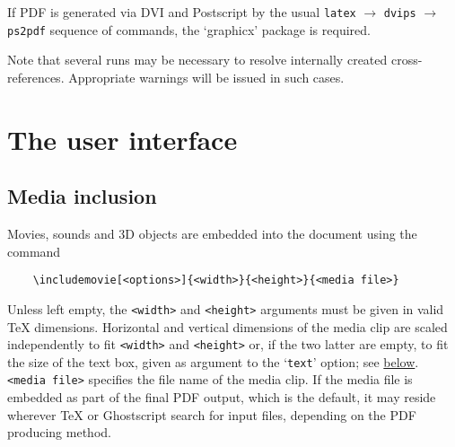 \documentclass[a4paper]{article}
\begin{document}
If PDF is generated via DVI and Postscript by the usual \verb+latex+ $\rightarrow$ \verb+dvips+ $\rightarrow$ \verb+ps2pdf+ sequence of commands, the `graphicx' package is required.

Note that several runs may be necessary to resolve internally created cross-references. Appropriate warnings will be issued in such cases.

\section{The user interface}
\subsection{Media inclusion}\label{usrif}
Movies, sounds and 3D objects are embedded into the document using the command
\begin{verbatim}
    \includemovie[<options>]{<width>}{<height>}{<media file>}
\end{verbatim}
Unless left empty, the \verb+<width>+ and \verb+<height>+ arguments must be given in valid \TeX{} dimensions. Horizontal and vertical dimensions of the media clip are scaled independently to fit \verb+<width>+ and \verb+<height>+ or, if the two latter are empty, to fit the size of the text box, given as argument to the `\verb+text+' option; see \hyperlink{lnk:textoption}{below}. \verb+<media file>+ specifies the file name of the media clip. If the media file is embedded as part of the final PDF output, which is the default, it may reside wherever \TeX{} or Ghostscript search for input files, depending on the PDF producing method.
\end{document}
